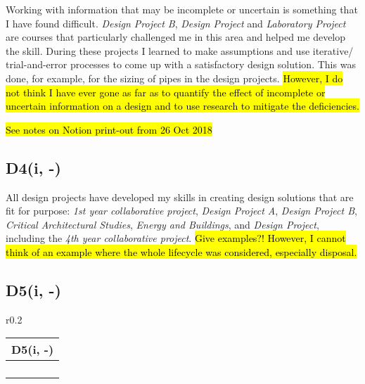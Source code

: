 Working with information that may be incomplete or uncertain is something that I have found difficult.
\textit{Design Project B}, \textit{Design Project} and \textit{Laboratory Project} are courses that particularly challenged me in this area and helped me develop the skill.
During these projects I learned to make assumptions and use iterative/ trial-and-error processes to come up with a satisfactory design solution.
This was done, for example, for the sizing of pipes in the design projects.
\hl{However, I do not think I have ever gone as far as to quantify the effect of incomplete or uncertain information on a design and to use research to mitigate the deficiencies.}

\hl{See notes on Notion print-out from 26 Oct 2018}


\subsection*{D4(i, -)}

All design projects have developed my skills in creating design solutions that are fit for purpose:
\textit{1st year collaborative project},
\textit{Design Project A},
\textit{Design Project B},
\textit{Critical Architectural Studies},
\textit{Energy and Buildings},
and \textit{Design Project}, including the \textit{4th year collaborative project}.
\hl{Give examples?! However, I cannot think of an example where the whole lifecycle was considered, especially disposal.}




\subsection*{D5(i, -)}

\begin{wraptable}[5]{r}{0.2\textwidth}
	\begin{tabular}{|ll|}
		\hline
		\multicolumn{2}{|c|}{\cellcolor[HTML]{F8A102}\textbf{D5(i, -)}} \\ \hline
		\IE & \DPA \\
		\DPB & \CAS \\
		\PRJ & \DST \\
		\LAB & \CCSA \\ \hline
	\end{tabular}
\end{wraptable}

